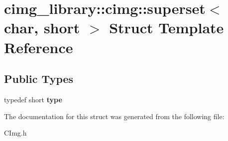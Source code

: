 \hypertarget{structcimg__library_1_1cimg_1_1superset_3_01char_00_01short_01_4}{\section{cimg\-\_\-library\-:\-:cimg\-:\-:superset$<$ char, short $>$ Struct Template Reference}
\label{structcimg__library_1_1cimg_1_1superset_3_01char_00_01short_01_4}
}
\subsection*{Public Types}
\begin{DoxyCompactItemize}
\item 
\hypertarget{structcimg__library_1_1cimg_1_1superset_3_01char_00_01short_01_4_af3d9867baecc3fd7205e76d0fd6f6737}{typedef short {\bfseries type}}\label{structcimg__library_1_1cimg_1_1superset_3_01char_00_01short_01_4_af3d9867baecc3fd7205e76d0fd6f6737}

\end{DoxyCompactItemize}


The documentation for this struct was generated from the following file\-:\begin{DoxyCompactItemize}
\item 
C\-Img.\-h\end{DoxyCompactItemize}
